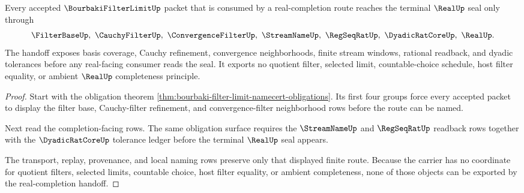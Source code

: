 \begin{theorem}
\label{thm:bourbaki-filter-limit-real-completion-handoff}
Every accepted $\BourbakiFilterLimitUp$ packet that is consumed by a real-completion route reaches the terminal $\RealUp$ seal only through
$$
\FilterBaseUp,\ \CauchyFilterUp,\ \ConvergenceFilterUp,\ \StreamNameUp,\ \RegSeqRatUp,\ \DyadicRatCoreUp,\ \RealUp .
$$
The handoff exposes basis coverage, Cauchy refinement, convergence neighborhoods, finite stream windows, rational readback, and dyadic tolerances before any real-facing consumer reads the seal. It exports no quotient filter, selected limit, countable-choice schedule, host filter equality, or ambient $\RealUp$ completeness principle.
\end{theorem}
\begin{proof}
Start with the obligation theorem \autoref{thm:bourbaki-filter-limit-namecert-obligations}. Its first four groups force every accepted packet to display the filter base, Cauchy-filter refinement, and convergence-filter neighborhood rows before the route can be named.

Next read the completion-facing rows. The same obligation surface requires the $\StreamNameUp$ and $\RegSeqRatUp$ readback rows together with the $\DyadicRatCoreUp$ tolerance ledger before the terminal $\RealUp$ seal appears.

The transport, replay, provenance, and local naming rows preserve only that displayed finite route. Because the carrier has no coordinate for quotient filters, selected limits, countable choice, host filter equality, or ambient completeness, none of those objects can be exported by the real-completion handoff.
\end{proof}



